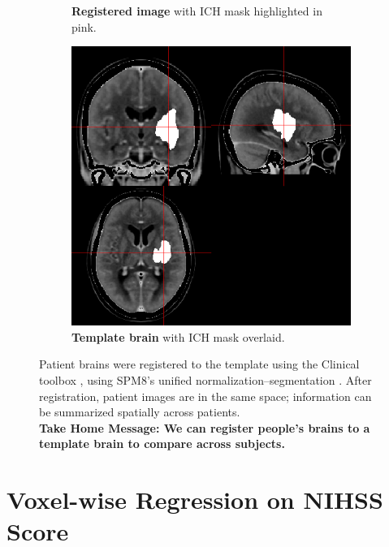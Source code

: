 \documentclass[final]{beamer}\usepackage[]{graphicx}\usepackage[]{color}
\begin{document}
\begin{frame}[fragile]
\begin{multicols}{2}
\begin{figure}[htbp]
\begin{subfigure}[t]{0.25\linewidth}
  \caption{\textbf{Registered image} with ICH mask highlighted in pink.}
  \label{reg:co2}
  \end{subfigure}
 \begin{subfigure}[t]{0.25\linewidth} 
  \includegraphics[width=\linewidth]{roi_spm_191-375_20100410_0404_CT_2_CT_STANDARD.png}
  \caption{\textbf{Template brain} with ICH mask overlaid.}
  \label{reg:temp2}
  \end{subfigure}
   \begin{minipage}[b]{0.2\linewidth}
	  	\caption{Patient brains were registered to the template using the Clinical toolbox \citep{rorden_age-specific_2012}, using SPM8's unified normalization–segmentation \citep{ashburner_unified_2005}. After registration, patient images are in the same space; information can be summarized spatially across patients. \vspace{1cm} \\
	  	{\bf Take Home Message: We can register people's brains to a template brain to compare across subjects.}
		}
	  \label{f:reg}
\end{minipage}  
\end{figure}


\section{Voxel-wise Regression on NIHSS Score}



\end{multicols}
\end{frame}
\end{document}
